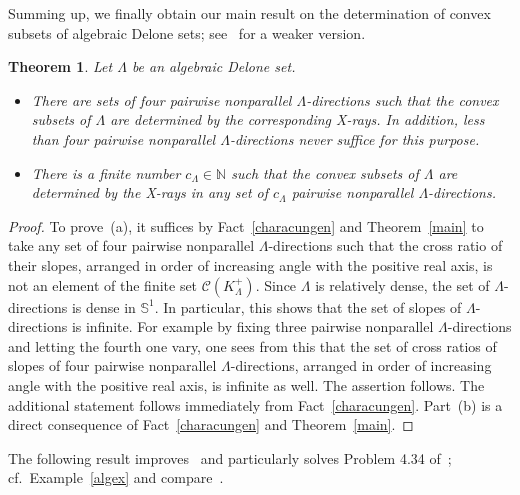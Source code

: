 \documentclass[a4paper]{amsart}
\newtheorem{theorem}{Theorem}[section]
\theoremstyle{definition}
\numberwithin{equation}{section}
\numberwithin{theorem}{section}
\begin{document}
Summing up, we finally obtain our main result on the
determination of convex subsets of algebraic Delone sets;
see~\cite[Thm.~ 4.21]{H5} for a
weaker version. 

\begin{theorem}\label{dtmain}
Let $\varLambda$ be an algebraic Delone set.
\begin{itemize}
\item[(a)]
There are sets of four pairwise nonparallel $\varLambda$-directions
such that the convex subsets of $\varLambda$ are determined by the corresponding
X-rays. In addition, less than four pairwise nonparallel $\varLambda$-directions never
suffice for this purpose.
\item[(b)]
There is a finite number $c_{\varLambda}\in{\mathbb{N}}$ such that the convex subsets of
$\varLambda$ are determined by the X-rays in any set of $c_{\varLambda}$
pairwise nonparallel $\varLambda$-directions. 
\end{itemize}
\end{theorem}
\begin{proof}
To prove~(a), it suffices by Fact~\ref{characungen} and
Theorem~\ref{main} to take any set of four pairwise
nonparallel $\varLambda$-directions such that the cross ratio of their
slopes, arranged in order
of increasing angle with the positive real axis, is not an element of
the finite set $\mathcal{C}(K_{\varLambda}^+)$. Since
$\varLambda$ is relatively dense, the set of $\varLambda$-directions
is dense in $\mathbb{S}^1$. In particular, this shows that the set of
slopes of $\varLambda$-directions is infinite. For example by fixing three
pairwise nonparallel 
$\varLambda$-directions and letting the fourth one vary, one sees from
this that
the set of cross ratios of
slopes of four pairwise
nonparallel $\varLambda$-directions, arranged in order
of increasing angle with the positive real axis, is infinite as well.
The assertion follows. The additional statement follows immediately
from Fact~\ref{characungen}. Part~(b) is a direct consequence of
Fact~\ref{characungen} and Theorem~\ref{main}.
\end{proof}

The following result improves~\cite[Thm.~
4.33]{H5} and particularly solves Problem 4.34
of~\cite{H5}; cf.~Example~\ref{algex} and compare~\cite[Thm.~ 5.7]{GG}.
\end{document}
